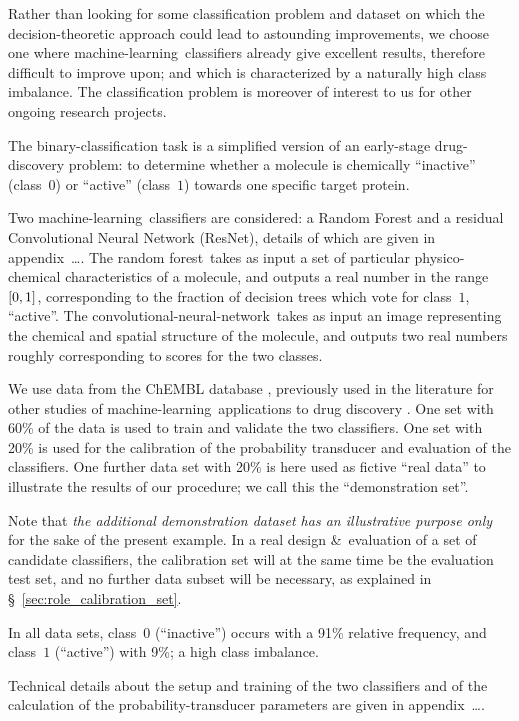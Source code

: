\documentclass[\ifafour a4paper,12pt,\else a5paper,10pt,\fi%
onecolumn,oneside,article,%
british%
]{memoir}
\theoremstyle{remark}
\theoremstyle{innote}
\newcommand*{\amp}{\&}
\newcommand*{\wrench}{{\fontencoding{U}\fontfamily{fontawesomethree}\selectfont\symbol{114}}}
\newcommand*{\pencil}{{\fontencoding{U}\fontfamily{fontawesometwo}\selectfont\symbol{210}}}
\newcommand{\mynotew}[1]{{\footnotesize\color{notecolour}\wrench\ #1}}
\newcommand{\mynotep}[1]{{\footnotesize\color{notecolour}\pencil\ #1}}
\DeclarePairedDelimiter\clcl{[}{]}
\renewcommand*{\|}[1][]{\nonscript\:#1\vert\nonscript\:\mathopen{}}
\newcommand*{\sect}{\S}%
\newcommand*{\ml}{machine-learning}
\newcommand*{\RF}{random forest}
\newcommand*{\cnn}{convolutional-neural-network}
\begin{document}
Rather than looking for some classification problem and dataset on which the decision-theoretic approach could lead to astounding improvements, we choose one where \ml\ classifiers already give excellent results, therefore difficult to improve upon; and which is characterized by a naturally high class imbalance. The classification problem is moreover of interest to us for other ongoing research projects.

The binary-classification task is a simplified version of an early-stage drug-discovery problem: to determine whether a molecule is chemically \enquote{inactive} (class~$0$) or \enquote{active} (class~$1$) towards one specific target protein.

Two \ml\ classifiers are considered: a Random Forest and a residual Convolutional Neural Network (ResNet), details of which are given in appendix\mynotep{\ldots}. The \RF\ takes as input a set of particular physico-chemical characteristics of a molecule, and outputs a real number in the range $\clcl{0,1}$, corresponding to the fraction of decision trees which vote for class~$1$, \enquote{active}. The \cnn\ takes as input an image representing the chemical and spatial structure of the molecule, and outputs two real numbers roughly corresponding to scores for the two classes.

We use data from the ChEMBL database \autocites{bentoetal2014}, previously used in the literature for other studies of \ml\ applications to drug discovery \autocites{koutsoukasetal2017}. One set with 60\% of the data is used to train and validate the two classifiers. One set with 20\% is used for the calibration of the probability transducer and evaluation of the classifiers. One further data set with 20\% is here used as fictive \enquote{real data} to illustrate the results of our procedure; we call this the \enquote{demonstration set}.

Note that \emph{the additional demonstration dataset has an illustrative purpose only} for the sake of the present example. In a real design \amp\ evaluation of a set of candidate classifiers, the calibration set will at the same time be the evaluation test set, and no further data subset will be necessary, as explained in \sect~\ref{sec:role_calibration_set}.

In all data sets, class~$0$ (\enquote{inactive}) occurs with a 91\% relative frequency, and class~$1$ (\enquote{active}) with 9\%; a high class imbalance.

Technical details about the setup and training of the two classifiers and of the calculation of the probability-transducer parameters are given in appendix\mynotew{\ldots}.
\end{document}
